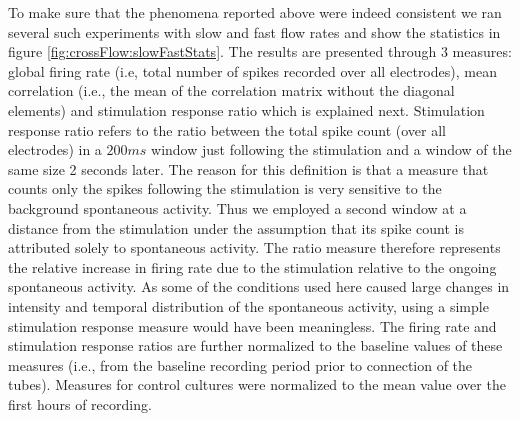         To make sure that the phenomena reported above were indeed consistent we ran several such experiments with slow and fast flow rates and show the statistics in figure \ref{fig:crossFlow:slowFastStats}. The results are presented through 3 measures: global firing rate (i.e, total number of spikes recorded over all electrodes), mean correlation (i.e., the mean of the correlation matrix without the diagonal elements) and stimulation response ratio which is explained next. Stimulation response ratio refers to the ratio between the total spike count (over all electrodes) in a \(200 ms\) window just following the stimulation and a window of the same size 2 seconds later. The reason for this definition is that a measure that counts only the spikes following the stimulation is very sensitive to the background spontaneous activity. Thus we employed a second window at a distance from the stimulation under the assumption that its spike count is attributed solely to spontaneous activity. The ratio measure therefore represents the relative increase in  firing rate due to the stimulation relative to the ongoing spontaneous activity. As some of the conditions used here caused large changes in intensity and temporal distribution of the spontaneous activity, using a simple stimulation response measure would have been meaningless. The firing rate and stimulation response ratios are further normalized to the baseline values of these measures (i.e., from the baseline recording period prior to connection of the tubes). Measures for control cultures were normalized to the mean value over the first hours of recording.

